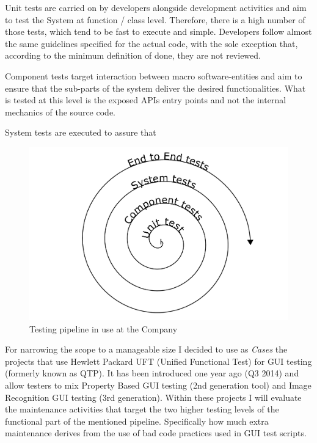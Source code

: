Unit tests are carried on by developers alongside development activities and aim to test the System at function / class level. Therefore, there is a high number of those tests, which tend to be fast to execute and simple. Developers follow almost the same guidelines specified for the actual code, with the sole exception that, according to the minimum definition of done, they are not reviewed.

Component tests target interaction between macro software-entities and aim to ensure that the sub-parts of the system deliver the desired functionalities. What is tested at this level is the exposed APIs entry points and not the internal mechanics of the source code.

System tests are executed to assure that 


\begin{figure}[ht]
    \centering
    \includegraphics[width=\textwidth]{figure/testing_pipeline.pdf}
    \caption{Testing pipeline in use at the Company}
    \label{fig:testing_pipeline}
\end{figure}

For narrowing the scope to a manageable size I decided to use as \textit{Cases} the projects that use Hewlett Packard UFT (Unified Functional Test) for GUI testing (formerly known as QTP). It has been introduced one year ago (Q3 2014) and allow testers to mix Property Based GUI testing (2nd generation tool) and Image Recognition GUI testing (3rd generation). Within these projects I will evaluate the maintenance activities that target the two higher testing levels of the functional part of the mentioned pipeline. Specifically how much extra maintenance derives from the use of bad code practices used in GUI test scripts.

